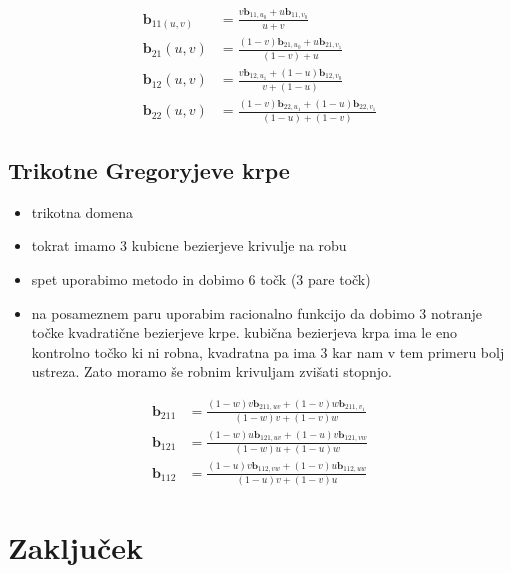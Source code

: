 \documentclass[a4paper,12pt]{article}
\newcommand{\tbf}{\textbf}
\begin{document}
\begin{align*}
\textbf{b}_{11(u,v)} &=  \frac{v \textbf{b}_{11,u_0}+u\tbf{b}_{11,v_0}}{u +v} \\
\tbf{b}_{21}(u,v) &= \frac{(1-v) \tbf{b}_{21,u_0}+u\tbf{b}_{21,v_1}}{(1-v)+u} \\
\tbf{b}_{12}(u,v) &= \frac{v \tbf{b}_{12,u_1}+(1-u)\tbf{b}_{12,v_0}}{v+(1-u)} \\
\tbf{b}_{22}(u,v) &= \frac{(1-v) \tbf{b}_{22,u_1}+(1-u)\tbf{b}_{22,v_1}}{(1-u)+(1-v)} 
\end{align*}	

\subsection{Trikotne Gregoryjeve krpe}
\begin{itemize}
	\item trikotna domena
	\item tokrat imamo 3 kubicne bezierjeve krivulje na robu
	\item spet uporabimo metodo in dobimo 6 točk (3 pare točk)
	\item na posameznem paru uporabim racionalno funkcijo da dobimo 3 notranje točke kvadratične bezierjeve krpe. kubična bezierjeva krpa ima le eno kontrolno točko ki ni robna, kvadratna pa ima 3 kar nam v tem primeru bolj ustreza. Zato moramo še robnim krivuljam zvišati stopnjo.
\end{itemize}


\begin{align*}
\tbf{b}_{211} &= \frac{(1-w)v \tbf{b}_{211,uv}+(1-v)w\tbf{b}_{211,v_1}}{(1-w)v+(1-v)w} \\
\tbf{b}_{121} &= \frac{(1-w)u \tbf{b}_{121,uv}+(1-u)v\tbf{b}_{121,vw}}{(1-w)u+(1-u)w} \\
\tbf{b}_{112} &= \frac{(1-u)v \tbf{b}_{112,vw}+(1-v)u\tbf{b}_{112,uw}}{(1-u)v+(1-v)u} 
\end{align*}

\section{Zaključek}
\end{document}
